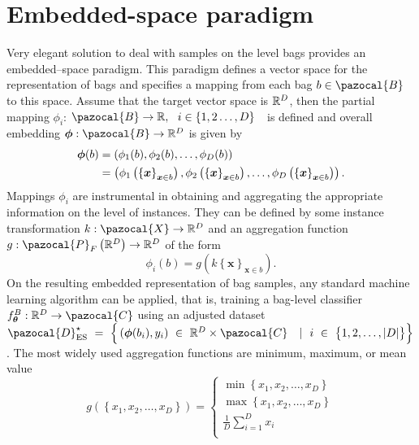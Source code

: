 \section{Embedded-space paradigm}
Very elegant solution to deal with samples on the level bags provides an embedded--space paradigm\cite{mandlik}. This paradigm defines a vector space for the representation of bags and specifies a mapping from each bag $b\in \pazocal{B}$ to this space. Assume that the target vector space is $\mathbb{R}^D$, then the partial mapping $\phi_i$: $\pazocal{B} \to \R,~~ i\in\left\lbrace1,2\dots, D\right\rbrace$~~is defined and overall embedding $\boldsymbol{\phi}: \pazocal{B} \to \R^D $ is given by
\begin{align}
	\boldsymbol{\phi}(b) &= \left(\phi_1(b), \phi_2(b), \dots, \phi_D(b)\right)\\
	&= \left(\phi_1\left(\left\lbrace \boldsymbol{x} \right\rbrace_{\boldsymbol{x} \in b}\right), \phi_2\left(\left\lbrace \boldsymbol{x} \right\rbrace_{\boldsymbol{x} \in b}\right), \dots, \phi_D\left(\left\lbrace \boldsymbol{x} \right\rbrace_{\boldsymbol{x} \in b}\right)\right).
\end{align}
Mappings $\phi_i$ are instrumental in obtaining and aggregating the appropriate information on the level of instances. They can be defined by some instance transformation $k:\pazocal{X}\to \R^D$ and an aggregation function $g:\pazocal{P}_F\left(\R^D\right) \to \R^D$ of the form 
\begin{equation}
	\phi_i(b)=g\left( k\left\lbrace\boldsymbol{x}\right\rbrace_{\boldsymbol{x} \in b}\right).
\end{equation}
On the resulting embedded representation of bag samples, any standard machine learning algorithm can be applied, that is, training a bag-level classifier $f_{\boldsymbol{\theta}}^B :\R^D \to \pazocal{C}$ using an adjusted dataset $\pazocal{D}^\star_{\mathrm{ES}}~=~\Big\lbrace \left(\boldsymbol{\phi}(b_i), y_i\right)~\in~\R^D\times\pazocal{C}~\ ~|~\ i~\in~\big\lbrace 1,2,\dots,\vert D\vert\big\rbrace\Big\rbrace$. The most widely used aggregation functions are minimum, maximum, or mean value
\begin{equation}
    g\left(\left\lbrace x_1,x_2,\dots,x_D \right\rbrace \right) = \begin{cases}
	 \min \left\lbrace x_1,x_2,\dots,x_D\right\rbrace\\
	 \max  \left\lbrace x_1,x_2,\dots,x_D\right\rbrace\\
	 \frac{1}{D}\sum_{i=1}^D x_i \\
\end{cases}   
\end{equation}
